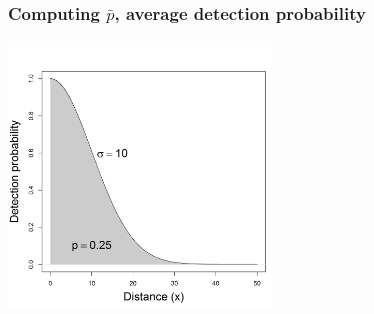 \documentclass[color=usenames,dvipsnames]{beamer}\usepackage[]{graphicx}\usepackage[]{color}
\begin{document}
\begin{frame}
  \frametitle{Computing $\bar{p}$, average detection probability}
\begin{center}
  \includegraphics[width=7cm]{figs/detfun4}
\end{center}
\end{frame}









\end{document}
